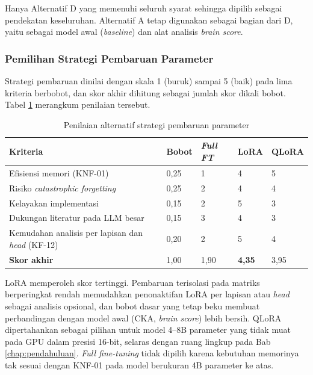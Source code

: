   Hanya Alternatif D yang memenuhi seluruh syarat sehingga dipilih sebagai pendekatan keseluruhan. Alternatif A tetap digunakan sebagai bagian dari D, yaitu sebagai model awal (\textit{baseline}) dan alat analisis \textit{brain score}.

  \subsubsection{Pemilihan Strategi Pembaruan Parameter}

  Strategi pembaruan dinilai dengan skala 1 (buruk) sampai 5 (baik) pada lima kriteria berbobot, dan skor akhir dihitung sebagai jumlah skor dikali bobot. Tabel \ref{tab:am_skor_pembaruan} merangkum penilaian tersebut.

  \begin{table}[h]
    \centering
    \caption{Penilaian alternatif strategi pembaruan parameter}
    \label{tab:am_skor_pembaruan}
    \small
    \begin{tabularx}{\textwidth}{p{6.7cm} | X | X | X | X}
      \hline
      \textbf{Kriteria} & \textbf{Bobot} & \textbf{\textit{Full FT}} & \textbf{LoRA} & \textbf{QLoRA} \\
      \hline
      Efisiensi memori (KNF-01) & 0,25 & 1 & 4 & 5 \\
      Risiko \textit{catastrophic forgetting} & 0,25 & 2 & 4 & 4 \\
      Kelayakan implementasi & 0,15 & 2 & 5 & 3 \\
      Dukungan literatur pada LLM besar & 0,15 & 3 & 4 & 3 \\
      Kemudahan analisis per lapisan dan \textit{head} (KF-12) & 0,20 & 2 & 5 & 4 \\
      \hline
      \textbf{Skor akhir} & 1,00 & 1,90 & \textbf{4,35} & 3,95 \\
      \hline
    \end{tabularx}
  \end{table}

  LoRA memperoleh skor tertinggi. Pembaruan terisolasi pada matriks berperingkat rendah memudahkan penonaktifan LoRA per lapisan atau \textit{head} sebagai analisis opsional, dan bobot dasar yang tetap beku membuat perbandingan dengan model awal (CKA, \textit{brain score}) lebih bersih. QLoRA dipertahankan sebagai pilihan untuk model 4--8B parameter yang tidak muat pada GPU dalam presisi 16-bit, selaras dengan ruang lingkup pada Bab \ref{chap:pendahuluan}. \textit{Full fine-tuning} tidak dipilih karena kebutuhan memorinya tak sesuai dengan KNF-01 pada model berukuran 4B parameter ke atas.

